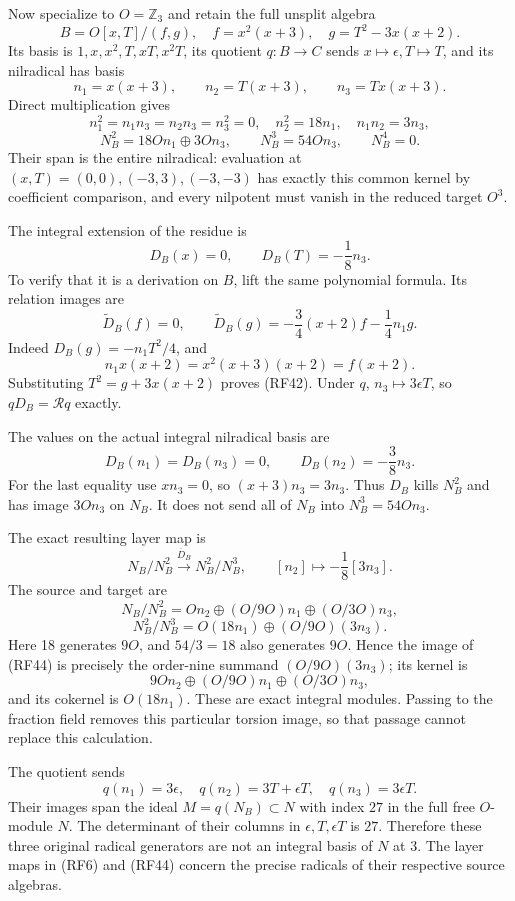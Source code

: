 \documentclass[
  10pt,
]{article}
\begin{document}
Now specialize to \(O=\mathbb Z_3\) and retain the full unsplit algebra
\[
B=O[x,T]/(f,g),\quad
f=x^2(x+3),\quad g=T^2-3x(x+2).
\tag{RF39}
\] Its basis is \(1,x,x^2,T,xT,x^2T\), its quotient \(q:B\to C\) sends
\(x\mapsto\epsilon,T\mapsto T\), and its nilradical has basis \[
n_1=x(x+3),\qquad n_2=T(x+3),\qquad n_3=Tx(x+3).
\] Direct multiplication gives \[
n_1^2=n_1n_3=n_2n_3=n_3^2=0,\quad
n_2^2=18n_1,\quad n_1n_2=3n_3,
\] \[
N_B^2=18On_1\oplus3On_3,\qquad
N_B^3=54On_3,\qquad N_B^4=0.
\tag{RF40}
\] Their span is the entire nilradical: evaluation at
\((x,T)=(0,0),(-3,3),(-3,-3)\) has exactly this common kernel by
coefficient comparison, and every nilpotent must vanish in the reduced
target \(O^3\).

The integral extension of the residue is \[
D_B(x)=0,\qquad D_B(T)=-\frac18n_3.
\tag{RF41}
\] To verify that it is a derivation on \(B\), lift the same polynomial
formula. Its relation images are \[
\widetilde D_B(f)=0,\qquad
\widetilde D_B(g)
=-\frac34(x+2)f-\frac14n_1g.
\tag{RF42}
\] Indeed \(D_B(g)=-n_1T^2/4\), and \[
n_1x(x+2)=x^2(x+3)(x+2)=f(x+2).
\] Substituting \(T^2=g+3x(x+2)\) proves (RF42). Under \(q\),
\(n_3\mapsto3\epsilon T\), so \(qD_B=\mathcal Rq\) exactly.

The values on the actual integral nilradical basis are \[
D_B(n_1)=D_B(n_3)=0,\qquad D_B(n_2)=-\frac38n_3.
\tag{RF43}
\] For the last equality use \(xn_3=0\), so \((x+3)n_3=3n_3\). Thus
\(D_B\) kills \(N_B^2\) and has image \(3On_3\) on \(N_B\). It does not
send all of \(N_B\) into \(N_B^3=54On_3\).

The exact resulting layer map is \[
N_B/N_B^2\xrightarrow{\overline D_B}N_B^2/N_B^3,
\qquad[n_2]\longmapsto-\frac18[3n_3].
\tag{RF44}
\] The source and target are \[
N_B/N_B^2
=On_2\oplus(O/9O)n_1\oplus(O/3O)n_3,
\] \[
N_B^2/N_B^3
=O(18n_1)\oplus(O/9O)(3n_3).
\tag{RF45}
\] Here 18 generates \(9O\), and \(54/3=18\) also generates \(9O\).
Hence the image of (RF44) is precisely the order-nine summand
\((O/9O)(3n_3)\); its kernel is \[
9On_2\oplus(O/9O)n_1\oplus(O/3O)n_3,
\] and its cokernel is \(O(18n_1)\). These are exact integral modules.
Passing to the fraction field removes this particular torsion image, so
that passage cannot replace this calculation.

The quotient sends \[
q(n_1)=3\epsilon,\quad
q(n_2)=3T+\epsilon T,\quad
q(n_3)=3\epsilon T.
\tag{RF46}
\] Their images span the ideal \(M=q(N_B)\subset N\) with index \(27\)
in the full free \(O\)-module \(N\). The determinant of their columns in
\(\epsilon,T,\epsilon T\) is \(27\). Therefore these three original
radical generators are not an integral basis of \(N\) at 3. The layer
maps in (RF6) and (RF44) concern the precise radicals of their
respective source algebras.
\end{document}
